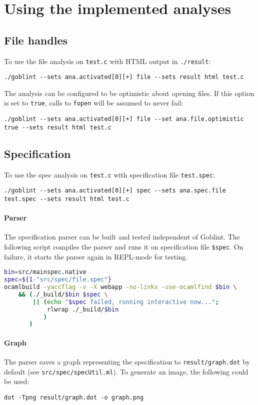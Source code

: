 \section{Using the implemented analyses}
\label{sec:app:use_ana}
\subsection{File handles}
To use the file analysis on \verb|test.c| with HTML output in \verb|./result|:
\begin{lstlisting}
./goblint --sets ana.activated[0][+] file --sets result html test.c
\end{lstlisting}
The analysis can be configured to be optimistic about opening files. If this option is set to \verb|true|, calls to \verb|fopen| will be assumed to never fail:
\begin{lstlisting}
./goblint --sets ana.activated[0][+] file --set ana.file.optimistic true --sets result html test.c
\end{lstlisting}

\subsection{Specification}
To use the spec analysis on \verb|test.c| with specification file \verb|test.spec|:
\begin{lstlisting}
./goblint --sets ana.activated[0][+] spec --sets ana.spec.file test.spec --sets result html test.c
\end{lstlisting}
\paragraph*{Parser}
The specification parser can be built and tested independent of Goblint. The following script compiles the parser and runs it on specification file \verb|$spec|. On failure, it starts the parser again in REPL-mode for testing.
\begin{lstlisting}[language=bash]
bin=src/mainspec.native
spec=${1-"src/spec/file.spec"}
ocamlbuild -yaccflag -v -X webapp -no-links -use-ocamlfind $bin \
    && (./_build/$bin $spec \
        || (echo "$spec failed, running interactive now...";
            rlwrap ./_build/$bin
           )
       )
\end{lstlisting}
\paragraph*{Graph}
The parser saves a graph representing the specification to \verb|result/graph.dot| by default (see \verb|src/spec/specUtil.ml|).
To generate an image, the following could be used:
\begin{lstlisting}
dot -Tpng result/graph.dot -o graph.png 
\end{lstlisting}
